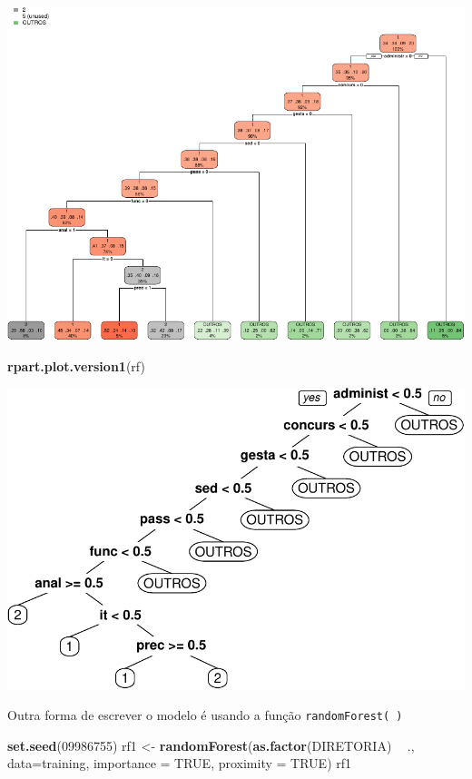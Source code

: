 \documentclass[]{article}
\newenvironment{Shaded}{\begin{snugshade}}{\end{snugshade}}
\newcommand{\DataTypeTok}[1]{\textcolor[rgb]{0.13,0.29,0.53}{#1}}
\newcommand{\DecValTok}[1]{\textcolor[rgb]{0.00,0.00,0.81}{#1}}
\newcommand{\KeywordTok}[1]{\textcolor[rgb]{0.13,0.29,0.53}{\textbf{#1}}}
\newcommand{\NormalTok}[1]{#1}
\newcommand{\OperatorTok}[1]{\textcolor[rgb]{0.81,0.36,0.00}{\textbf{#1}}}
\newcommand{\OtherTok}[1]{\textcolor[rgb]{0.56,0.35,0.01}{#1}}
\newcommand{\StringTok}[1]{\textcolor[rgb]{0.31,0.60,0.02}{#1}}
\begin{document}
\includegraphics{markdown_v50_files/figure-latex/unnamed-chunk-89-2.pdf}

\begin{Shaded}
\begin{Highlighting}[]
\KeywordTok{rpart.plot.version1}\NormalTok{(rf)}
\end{Highlighting}
\end{Shaded}

\includegraphics{markdown_v50_files/figure-latex/unnamed-chunk-89-3.pdf}

Outra forma de escrever o modelo é usando a função
\texttt{randomForest(\ )}

\begin{Shaded}
\begin{Highlighting}[]
\KeywordTok{set.seed}\NormalTok{(}\DecValTok{09986755}\NormalTok{)}
\NormalTok{rf1 <-}\StringTok{ }\KeywordTok{randomForest}\NormalTok{(}\KeywordTok{as.factor}\NormalTok{(DIRETORIA) }\OperatorTok{~}\StringTok{ }\NormalTok{., }\DataTypeTok{data=}\NormalTok{training,}
                    \DataTypeTok{importance =} \OtherTok{TRUE}\NormalTok{,}
                    \DataTypeTok{proximity =} \OtherTok{TRUE}\NormalTok{)}
\NormalTok{rf1}
\end{Highlighting}
\end{Shaded}
\end{document}
